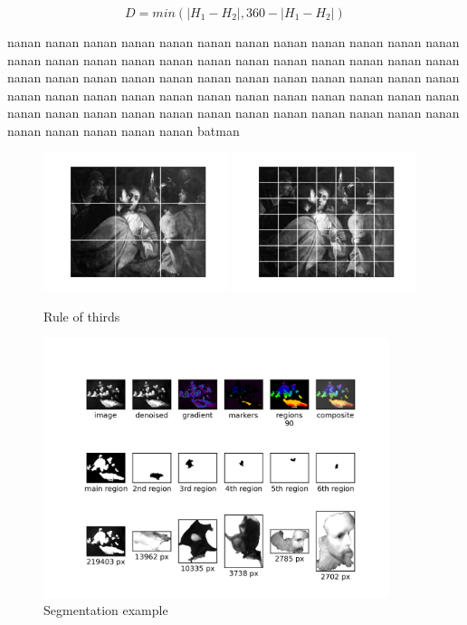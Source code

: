 \documentclass[11pt,a4paper]{report}
\begin{document}
\begin{multicols}{2}
\begin{figure}[!htb]
\begin{equation}
D = min( \lvert H_1 - H_2 \rvert , 360 - \lvert H_1 - H_2 \rvert )
\label{eqwheel}
\end{equation}
\end{figure}

nanan nanan nanan nanan nanan nanan nanan nanan nanan nanan nanan nanan nanan
nanan nanan nanan nanan nanan nanan nanan nanan nanan nanan nanan nanan nanan
nanan nanan nanan nanan nanan nanan nanan nanan nanan nanan nanan nanan nanan
nanan nanan nanan nanan nanan nanan nanan nanan nanan nanan nanan nanan nanan
nanan nanan nanan nanan nanan nanan nanan nanan nanan nanan nanan nanan nanan
batman

\begin{figure}[tbp]
\centering
\includegraphics[width=0.48\textwidth]{r3_L_caravaggio_1962_139_1}
\includegraphics[width=0.48\textwidth]{r7_L_caravaggio_1962_139_1}
\caption[Rule of thirds]{Rule of thirds}
\label{figr3}
\end{figure}

\begin{figure}
\centering
\includegraphics[width=0.9\textwidth]{segm_rembrandt_eu_464}
\caption[Segmentation example]{Segmentation example}
\label{figsegm}
\end{figure}


\end{multicols}
\end{document}

